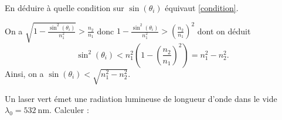 	
	\begin{enonce}
		En déduire à quelle condition sur $\sin(\theta_i)$ équivaut \eqref{condition}.
	\end{enonce}
	
	
	\begin{corrige}
		On a $\sqrt{1-\frac{\sin^2(\theta_i)}{n_1^2}}>\frac{n_2}{n_1}$ donc $1-\frac{\sin^2(\theta_i)}{n_1^2}>\left(\frac{n_2}{n_1}\right)^2$ dont on déduit 
		\[
		\sin^2(\theta_i)<n_1^2\left( 1-\left( \frac{n_2}{n_1}\right)^2 \right)=n_1^2-n_2^2.
		\]
		Ainsi, on a $\sin(\theta_i)<\sqrt{n_1^2-n_2^2}$.
	\end{corrige}
	
	
	
	
	
	
	\hauteurLargeurCadreReponse		{8mm}{2cm}
	\initialisationEntrainement
	
	Un laser vert émet une radiation lumineuse de longueur d'onde dans le vide $\lambda_0=\SI{532}{\nano\meter}$. Calculer :
	
	\debutEntrainement
	
